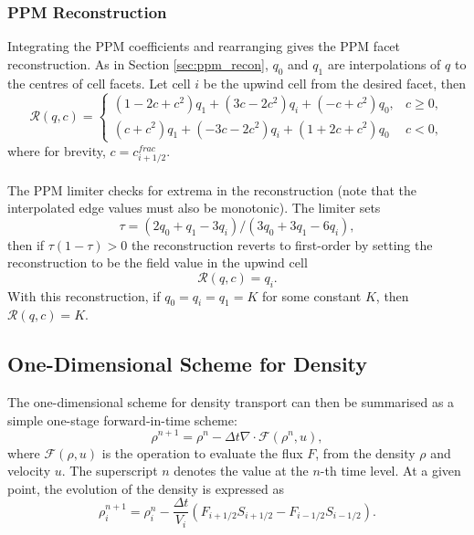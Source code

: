 \documentclass[11pt,a4paper]{article}
\begin{document}
\subsubsection{PPM Reconstruction} \label{sec:consistent_ppm}

Integrating the PPM coefficients and rearranging gives the PPM facet reconstruction.
As in Section \ref{sec:ppm_recon}, $q_0$ and $q_1$ are interpolations of $q$ to the centres of cell facets.
Let cell $i$ be the upwind cell from the desired facet, then
\begin{equation}
\mathcal{R}(q,c) =
\begin{cases}
(1-2c+c^2)q_1 + (3c-2c^2)q_{i} + (-c+c^2)q_0, & c \geq 0, \\
(c+c^2)q_1 + (-3c-2c^2)q_{i} + (1+2c+c^2)q_0 & c < 0,
\end{cases}
\end{equation}
where for brevity, $c=c^{frac}_{i+1/2}$. \\
\\
The PPM limiter checks for extrema in the reconstruction (note that the interpolated edge values must also be monotonic). The limiter sets
\begin{equation}
\tau = (2q_0+q_1-3q_{i})/(3q_0+3q_1-6q_{i}),
\end{equation}
then if $\tau (1-\tau) > 0$ the reconstruction reverts to first-order by setting the reconstruction to be the field value in the upwind cell
\begin{equation}
\mathcal{R}(q,c) = q_i.
\end{equation}
With this reconstruction, if $q_0=q_i=q_1=K$ for some constant $K$, then $\mathcal{R}(q,c)=K$.
\subsection{One-Dimensional Scheme for Density}
The one-dimensional scheme for density transport can then be summarised as a simple one-stage forward-in-time scheme:
\begin{equation}
\rho^{n+1} = \rho^n - \Delta t \nabla\cdot \mathcal{F}(\rho^n,u),
\end{equation}
where $\mathcal{F}(\rho,u)$ is the operation to evaluate the flux $F$, from the density $\rho$ and velocity $u$.
The superscript $n$ denotes the value at the $n$-th time level.
At a given point, the evolution of the density is expressed as
\begin{equation}
\rho_i^{n+1} = \rho^n_i - \frac{\Delta t}{V_i} \left(F_{i+1/2}S_{i+1/2} - F_{i-1/2}S_{i-1/2}\right).\end{equation}
\end{document}
